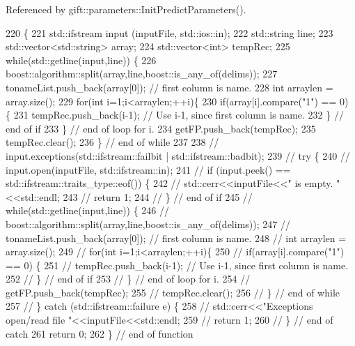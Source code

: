 Referenced by gift\+::parameters\+::\+Init\+Predict\+Parameters().


\begin{DoxyCode}
220                                                                    \{
221     std::ifstream input (inputFile, std::ios::in);
222     std::string line;
223     std::vector<std::string> array;
224     std::vector<int> tempRec;
225     \textcolor{keywordflow}{while}(std::getline(input,line)) \{
226       boost::algorithm::split(array,line,boost::is\_any\_of(delims));
227       tonameList.push\_back(array[0]); \textcolor{comment}{// first column is name.}
228       \textcolor{keywordtype}{int} arraylen = array.size();
229       \textcolor{keywordflow}{for}(\textcolor{keywordtype}{int} i=1;i<arraylen;++i)\{
230         \textcolor{keywordflow}{if}(array[i].compare(\textcolor{stringliteral}{"1"}) == 0) \{
231           tempRec.push\_back(i-1); \textcolor{comment}{// Use i-1, since first column is name.}
232         \} \textcolor{comment}{// end of if}
233       \} \textcolor{comment}{// end of loop for i.}
234       getFP.push\_back(tempRec);
235       tempRec.clear();
236     \} \textcolor{comment}{// end of while}
237 
238     \textcolor{comment}{// input.exceptions(std::ifstream::failbit | std::ifstream::badbit);}
239     \textcolor{comment}{// try \{}
240     \textcolor{comment}{//   input.open(inputFile, std::ifstream::in);}
241     \textcolor{comment}{//   if (input.peek() == std::ifstream::traits\_type::eof()) \{}
242     \textcolor{comment}{//     std::cerr<<inputFile<<" is empty. "<<std::endl;}
243     \textcolor{comment}{//     return 1;}
244     \textcolor{comment}{//   \} // end of if}
245     \textcolor{comment}{//   while(std::getline(input,line)) \{}
246     \textcolor{comment}{//     boost::algorithm::split(array,line,boost::is\_any\_of(delims));}
247     \textcolor{comment}{//     tonameList.push\_back(array[0]); // first column is name.}
248     \textcolor{comment}{//     int arraylen = array.size();}
249     \textcolor{comment}{//     for(int i=1;i<arraylen;++i)\{}
250     \textcolor{comment}{//       if(array[i].compare("1") == 0) \{}
251     \textcolor{comment}{//         tempRec.push\_back(i-1); // Use i-1, since first column is name.}
252     \textcolor{comment}{//       \} // end of if}
253     \textcolor{comment}{//     \} // end of loop for i.}
254     \textcolor{comment}{//     getFP.push\_back(tempRec);}
255     \textcolor{comment}{//     tempRec.clear();}
256     \textcolor{comment}{//   \} // end of while}
257     \textcolor{comment}{// \} catch (std::ifstream::failure e) \{}
258     \textcolor{comment}{//   std::cerr<<"Exceptions open/read file "<<inputFile<<std::endl;}
259     \textcolor{comment}{//   return 1;}
260     \textcolor{comment}{// \} // end of catch}
261     \textcolor{keywordflow}{return} 0;
262   \} \textcolor{comment}{// end of function}
\end{DoxyCode}

